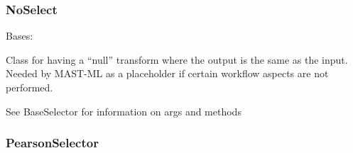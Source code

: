 \documentclass[letterpaper,10pt,english]{sphinxmanual}
\begin{document}
\begin{fulllineitems}

\begin{fulllineitems}
\label{\detokenize{api/mastml.feature_selectors.MASTMLFeatureSelector:mastml.feature_selectors.MASTMLFeatureSelector.transform}}
\end{fulllineitems}


\end{fulllineitems}



\subsubsection{NoSelect}
\label{\detokenize{api/mastml.feature_selectors.NoSelect:noselect}}\label{\detokenize{api/mastml.feature_selectors.NoSelect::doc}}

\begin{fulllineitems}
\label{\detokenize{api/mastml.feature_selectors.NoSelect:mastml.feature_selectors.NoSelect}}
Bases: {\hyperref[\detokenize{api/mastml.feature_selectors.BaseSelector:mastml.feature_selectors.BaseSelector}]{}}

Class for having a “null” transform where the output is the same as the input. Needed by MAST-ML as a placeholder if
certain workflow aspects are not performed.

See BaseSelector for information on args and methods

\end{fulllineitems}



\subsubsection{PearsonSelector}
\label{\detokenize{api/mastml.feature_selectors.PearsonSelector:pearsonselector}}\label{\detokenize{api/mastml.feature_selectors.PearsonSelector::doc}}
\end{document}
